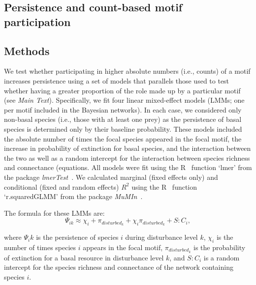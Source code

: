 \documentclass[12pt]{article}
\begin{document}
\begin{spacing}{2.0}
\clearpage

\section{Persistence and count-based motif participation}

    \subsection*{Methods}

        We test whether participating in higher absolute numbers (i.e., counts) of a motif increases persistence using a set of models that parallels those used to test whether having a greater proportion of the role made up by a particular motif (see \emph{Main Text}).  
        Specifically, we fit four linear mixed-effect models (LMMs; one per motif included in the Bayesian networks).
        In each case, we considered only non-basal species (i.e., those with at least one prey) as the persistence of basal species is determined only by their baseline probability.
        These models included the absolute number of times the focal species appeared in the focal motif, the increase in probability of extinction for basal species, and the interaction between the two as well as a random intercept for the interaction between species richness and connectance (equations.
        All models were fit using the R~\citep{R} function `lmer' from the package \emph{lmerTest}~\citep{lmerTest}.
        We calculated marginal (fixed effects only) and conditional (fixed and random effects) $R^2$ using the R~\citep{R} function `r.squaredGLMM' from the package \emph{MuMIn}~\citep{MuMIn}.

            The formula for these LMMs are:         
            \begin{equation}
                \Psi_{ik} \approx \chi_{i} + \pi_{disturbed_k} + \chi_{i}\pi_{disturbed_k} + S:C_{i} ,
                \label{absreq}
            \end{equation}
        
            \noindent where $\Psi_ik$ is the persistence of species $i$ during disturbance level $k$, $\chi_{i}$ is the number of times species $i$ appears in the focal motif, $\pi_{disturbed_k}$ is the probability of extinction for a basal resource in disturbance level $k$, and $S:C_{i}$ is a random intercept for the species richness and connectance of the network containing species $i$.
            
            
            


\end{spacing}
\end{document}

